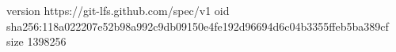 version https://git-lfs.github.com/spec/v1
oid sha256:118a022207e52b98a992c9db09150e4fe192d96694d6c04b3355ffeb5ba389cf
size 1398256
